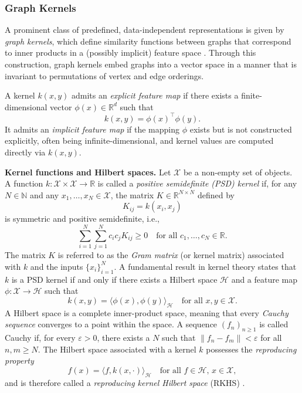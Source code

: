 \subsubsection{Graph Kernels}
\label{sec:theory:explicit}
A prominent class of predefined, data-independent representations is given by
\emph{graph kernels}, which define similarity functions between graphs that
correspond to inner products in a (possibly implicit) feature space
\citep{vishwanathan2010graph,kriege2020survey}. Through this construction, graph
kernels embed graphs into a vector space in a manner that is invariant to
permutations of vertex and edge orderings.
\begin{definition}
A kernel $k(x,y)$ admits an \emph{explicit feature map} if there exists a
finite-dimensional vector $\phi(x) \in \mathbb{R}^d$ such that
\[
k(x,y) = \phi(x)^\top \phi(y).
\]
It admits an \emph{implicit feature map} if the mapping $\phi$ exists but is
not constructed explicitly, often being infinite-dimensional, and kernel
values are computed directly via $k(x,y)$.
\end{definition}
\textbf{Kernel functions and Hilbert spaces.}
Let $\mathcal{X}$ be a non-empty set of objects.
A function $k:\mathcal{X}\times\mathcal{X}\to\mathbb{R}$ is called a
\emph{positive semidefinite (PSD) kernel} if, for any $N\in\mathbb{N}$ and any
$x_1,\dots,x_N\in\mathcal{X}$, the matrix
$K\in\mathbb{R}^{N\times N}$ defined by
\[
K_{ij}=k(x_i,x_j)
\]
is symmetric and positive semidefinite, i.e.,
\[
\sum_{i=1}^N \sum_{j=1}^N c_i c_j K_{ij} \ge 0
\quad \text{for all } c_1,\dots,c_N\in\mathbb{R}.
\]
The matrix $K$ is referred to as the \emph{Gram matrix} (or kernel matrix)
associated with $k$ and the inputs $\{x_i\}_{i=1}^N$. A fundamental result in kernel theory states that $k$ is a PSD kernel if and only
if there exists a Hilbert space $\mathcal{H}$ and a feature map
$\phi:\mathcal{X}\to\mathcal{H}$ such that
\[
k(x,y)=\langle \phi(x),\phi(y)\rangle_{\mathcal{H}}
\quad \text{for all } x,y\in\mathcal{X}.
\]
A Hilbert space is a complete inner-product space, meaning that every
\emph{Cauchy sequence} converges to a point within the space.
A sequence $(f_n)_{n\ge 1}$ is called Cauchy if, for every $\varepsilon>0$,
there exists a $N$ such that $\|f_n - f_m\| < \varepsilon$ for all $n,m \ge N$.
The Hilbert space associated with a kernel $k$ possesses the
\emph{reproducing property}
\[
f(x)=\langle f, k(x,\cdot)\rangle_{\mathcal{H}}
\quad \text{for all } f\in\mathcal{H},\, x\in\mathcal{X},
\]
and is therefore called a \emph{reproducing kernel Hilbert space} (RKHS)
\citep{Aronszajn1950TheoryOR}.

